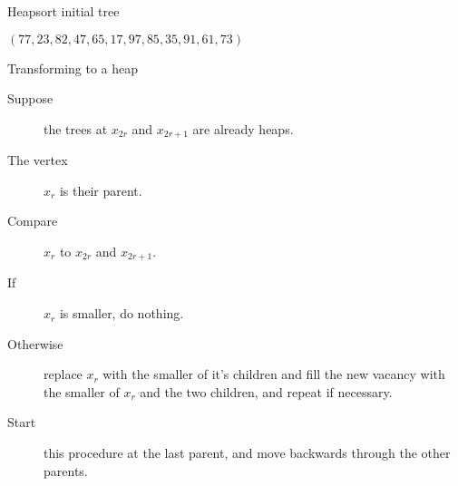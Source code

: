 \begin{frame}[fragile]{Heapsort initial tree}
  \begin{center}
    $(77,23,82,47,65,17,97,85,35,91,61,73)$ \\[1cm]
  \end{center}
\end{frame}


\begin{frame}{Transforming to a heap}
  \begin{description}
    \item[Suppose] the trees at $x_{2r}$ and $x_{2r+1}$ are already heaps.
    \item[The vertex] $x_r$ is their parent.
    \item[Compare] $x_r$ to $x_{2r}$ and $x_{2r+1}$.
    \item[If] $x_r$ is smaller, do nothing.
    \item[Otherwise] replace $x_r$ with the smaller of it's children and fill the new vacancy with the smaller of $x_r$ and the two children, and repeat if necessary.
    \item[Start] this procedure at the last parent, and move backwards through the other parents.
  \end{description}
\end{frame}


